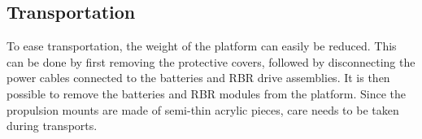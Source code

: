 \subsection{Transportation}

To ease transportation, the weight of the platform can easily be reduced. This can be done by first removing the protective covers, followed by disconnecting the power cables connected to the batteries and RBR drive assemblies. It is then possible to remove the batteries and RBR modules from the platform. Since the propulsion mounts are made of semi-thin acrylic pieces, care needs to be taken during transports. %
